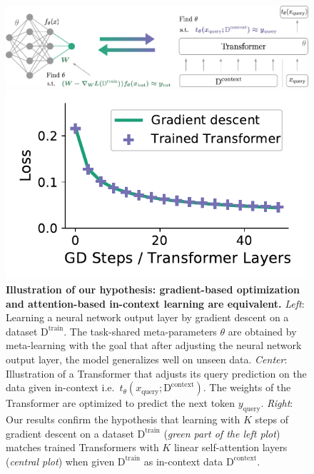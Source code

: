 \documentclass{article}
\theoremstyle{plain}
\theoremstyle{definition}
\theoremstyle{remark}
\begin{document}
\begin{figure}
\vspace{-5pt}
\hspace{20pt}
\begin{minipage}{.63\textwidth}
    \includegraphics[width=1.\textwidth]{Final_figures/figure_1.pdf}
\end{minipage}
\hspace{10pt}
\begin{minipage}{.3\textwidth}
    \includegraphics[width=.99\textwidth]{Final_figures/linear/rolling_out/train.pdf}
\end{minipage}
\vspace{-5pt}
  \caption{\textbf{Illustration of our hypothesis: {\color{gd_green} gradient-based optimization} and {\color{tf_purple} attention-based in-context learning} are equivalent.} \textit{Left}: Learning a neural network output layer by gradient descent on a dataset $\text{D}^{\text{train}}$. The task-shared meta-parameters $\theta$ are obtained by meta-learning with the goal that after adjusting the neural network output layer, the model generalizes well on unseen data. \textit{Center}: Illustration of a Transformer that adjusts its query prediction on the data given in-context i.e.\ $t_{\theta}(x_{\text{query}}; \text{D}^{\text{context}})$. The weights of the Transformer are optimized to predict the next token $y_{\text{query}}$.
  \textit{Right}: Our results confirm the hypothesis that learning with $K$ steps of gradient descent on a dataset $\text{D}^{\text{train}}$ (\emph{green part of the left plot}) matches trained Transformers with $K$ linear self-attention layers (\emph{central plot}) when given $\text{D}^{\text{train}}$ as in-context data $\text{D}^{\text{context}}$.}
  \label{fig:illus}
  \vspace{-13pt}
\end{figure}
 
\end{document}
